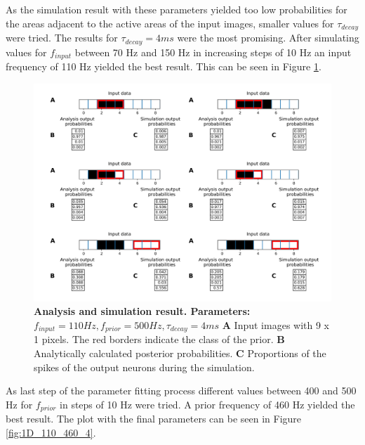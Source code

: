 As the simulation result with these parameters yielded too low probabilities for the areas adjacent to the active areas of the input images, smaller values for $\tau_{decay}$ were tried. The results for $\tau_{decay} = 4ms$ were the most promising. After simulating values for $f_{input}$ between 70 Hz and 150 Hz in increasing steps of 10 Hz an input frequency of 110 Hz yielded the best result. This can be seen in Figure \ref{fig:1D_110_500_4}.

\begin{figure}
  \includegraphics[width=\linewidth]{figures/1D/1D_110_500_4.png}
  \caption{\textbf{Analysis and simulation result. Parameters: }$f_{input} = 110 Hz, f_{prior} = 500 Hz, \tau_{decay} = 4 ms$ \textbf{A} Input images with 9 x 1 pixels. The red borders indicate the class of the prior. \textbf{B} Analytically calculated posterior probabilities. \textbf{C} Proportions of the spikes of the output neurons during the simulation.}
  \label{fig:1D_110_500_4}
\end{figure}

As last step of the parameter fitting process different values between 400 and 500 Hz for $f_{prior}$ in steps of 10 Hz were tried. A prior frequency of 460 Hz yielded the best result. The plot with the final parameters can be seen in Figure \ref{fig:1D_110_460_4}.

